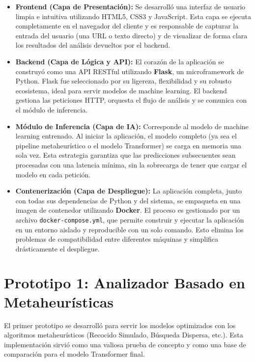 \begin{itemize}
    \item \textbf{Frontend (Capa de Presentación):} Se desarrolló una interfaz de usuario limpia e intuitiva utilizando HTML5, CSS3 y JavaScript. Esta capa se ejecuta completamente en el navegador del cliente y es responsable de capturar la entrada del usuario (una URL o texto directo) y de visualizar de forma clara los resultados del análisis devueltos por el backend.
    
    \item \textbf{Backend (Capa de Lógica y API):} El corazón de la aplicación se construyó como una API RESTful utilizando \textbf{Flask}, un microframework de Python. Flask fue seleccionado por su ligereza, flexibilidad y su robusto ecosistema, ideal para servir modelos de machine learning. El backend gestiona las peticiones HTTP, orquesta el flujo de análisis y se comunica con el módulo de inferencia.
    
    \item \textbf{Módulo de Inferencia (Capa de IA):} Corresponde al modelo de machine learning entrenado. Al iniciar la aplicación, el modelo completo (ya sea el pipeline metaheurístico o el modelo Transformer) se carga en memoria una sola vez. Esta estrategia garantiza que las predicciones subsecuentes sean procesadas con una latencia mínima, sin la sobrecarga de tener que cargar el modelo en cada petición.
    
    \item \textbf{Contenerización (Capa de Despliegue):} La aplicación completa, junto con todas sus dependencias de Python y del sistema, se empaqueta en una imagen de contenedor utilizando \textbf{Docker}. El proceso es gestionado por un archivo \texttt{docker-compose.yml}, que permite construir y ejecutar la aplicación en un entorno aislado y reproducible con un solo comando. Esto elimina los problemas de compatibilidad entre diferentes máquinas y simplifica drásticamente el despliegue.
\end{itemize}

\section{Prototipo 1: Analizador Basado en Metaheurísticas}
El primer prototipo se desarrolló para servir los modelos optimizados con los algoritmos metaheurísticos (Recocido Simulado, Búsqueda Dispersa, etc.). Esta implementación sirvió como una valiosa prueba de concepto y como una base de comparación para el modelo Transformer final.


